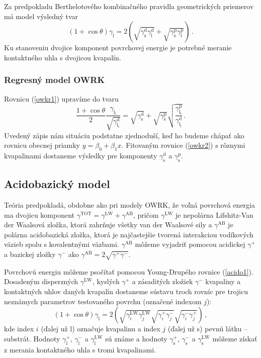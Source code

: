 \documentclass[12pt]{article}
\begin{document}
Za predpokladu Berthelotového kombinačného pravidla geometrických priemerov má model výsledný tvar
%
\begin{equation}
(1 + \cos \theta) \gamma_\mathrm{l} = 2 \left( \sqrt{\gamma^\mathrm{d}_\mathrm{s} \gamma^\mathrm{d}_\mathrm{l}} + \sqrt{\gamma^\mathrm{p}_\mathrm{s} \gamma^\mathrm{p}_\mathrm{l}}  \right) \, \mathrm{.} \label{owkr1}
\end{equation}
%
Ku stanoveniu dvojice komponent povrchovej energie je potrebné meranie kontaktného uhla s dvojicou kvapalín.

\subsubsection{Regresný model OWRK}
Rovnicu (\ref{owkr1}) upravíme do tvaru
%
\begin{equation}
\frac{1 + \cos \theta}{2} \frac{\gamma_\mathrm{l_i}}{\sqrt{\gamma^\mathrm{d}_\mathrm{l_i}}}
=
\sqrt{\gamma^\mathrm{d}_\mathrm{s}}
+
\sqrt{\gamma^\mathrm{p}_\mathrm{s}}
\sqrt{\frac{\gamma^\mathrm{p}_\mathrm{l_i} } {\gamma^\mathrm{d}_\mathrm{l_i} } } \, \mathrm{.} \label{owkr2}
\end{equation}
%
Uvedený zápis nám situáciu podstatne zjednoduší, keď ho budeme chápať ako rovnicu obecnej priamky $y = \beta_0 + \beta_1 x$.
Fitovaným rovnice (\ref{owkr2}) s rôznymi kvapalinami dostaneme výsledky pre komponenty $\gamma^\mathrm{d}_\mathrm{s}$ a $\gamma^\mathrm{p}_\mathrm{s}$.


\subsection{Acidobazický model}
Teória predpokladá, obdobne ako pri modely OWRK, že voľná povrchová energia ma dvojicu komponent $\gamma^\mathrm{TOT} = \gamma^\mathrm{LW} + \gamma^\mathrm{AB}$, pričom $\gamma^\mathrm{LW}$ je nepolárna Lifshitz-Van der Waalsová zložka, ktorá zahrňuje všetky van der Waalsové sily a $\gamma^\mathrm{AB}$ je polárna acidobazická zložka, ktorá je najčastejšie tvorená interakciou vodíkových väzieb spolu s kovalentnými väzbami.
$\gamma^\mathrm{AB}$ môžeme vyjadriť pomocou acidickej $\gamma^+$ a bazickej zložky $\gamma^-$ ako $\gamma^\mathrm{AB} = 2 \sqrt{\gamma^+ \gamma^-}$.

Povrchovú energiu môžeme psočítať pomocou Young-Drupého rovnice (\ref{acido1}). Dosadeným disperzných $\gamma^\mathrm{LW}$, kyslých $\gamma^+$ a zásaditých zložiek $\gamma^-$ kvapaliny a kontaktných uhlov daných kvapalín dostaneme sústavu troch rovníc pre trojicu neznámych parametrov testovaného povrchu (označené indexom $j$):
%
\begin{equation}
(1 + \cos \theta) \gamma_\mathrm{l} = 
2 \left(
\sqrt{\gamma^\mathrm{LW}_i \gamma^\mathrm{LW}_j }
\sqrt{\gamma^+_i \gamma^-_j }
\sqrt{\gamma^-_i \gamma^+_j }
\right) \, \mathrm{,} \label{acido1}
\end{equation}
%
kde index $i$ (ďalej už l) označuje kvapalinu a index $j$ (ďalej už s) pevnú látku – substrát. Hodnoty $\gamma^+_\mathrm{l}$, $\gamma_\mathrm{l}^-$ a $\gamma_\mathrm{l}^\mathrm{LW}$ sú známe a hodnoty $\gamma^+_\mathrm{s}$, $\gamma_\mathrm{s}^-$ a $\gamma_\mathrm{s}^\mathrm{LW}$ môžeme získať z merania kontaktného uhla s tromi kvapalinami.
\end{document}
